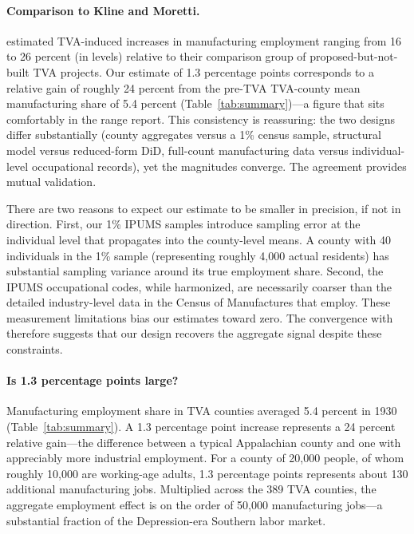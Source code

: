 \documentclass[12pt]{article}
\begin{document}
\paragraph{Comparison to Kline and Moretti.} \citet{kline2014} estimated TVA-induced increases in manufacturing employment ranging from 16 to 26 percent (in levels) relative to their comparison group of proposed-but-not-built TVA projects. Our estimate of 1.3 percentage points corresponds to a relative gain of roughly 24 percent from the pre-TVA TVA-county mean manufacturing share of 5.4 percent (Table~\ref{tab:summary})---a figure that sits comfortably in the range \citeauthor{kline2014} report. This consistency is reassuring: the two designs differ substantially (county aggregates versus a 1\% census sample, structural model versus reduced-form DiD, full-count manufacturing data versus individual-level occupational records), yet the magnitudes converge. The agreement provides mutual validation.

There are two reasons to expect our estimate to be smaller in precision, if not in direction. First, our 1\% IPUMS samples introduce sampling error at the individual level that propagates into the county-level means. A county with 40 individuals in the 1\% sample (representing roughly 4,000 actual residents) has substantial sampling variance around its true employment share. Second, the IPUMS occupational codes, while harmonized, are necessarily coarser than the detailed industry-level data in the Census of Manufactures that \citeauthor{kline2014} employ. These measurement limitations bias our estimates toward zero. The convergence with \citeauthor{kline2014} therefore suggests that our design recovers the aggregate signal despite these constraints.

\paragraph{Is 1.3 percentage points large?} Manufacturing employment share in TVA counties averaged 5.4 percent in 1930 (Table~\ref{tab:summary}). A 1.3 percentage point increase represents a 24 percent relative gain---the difference between a typical Appalachian county and one with appreciably more industrial employment. For a county of 20,000 people, of whom roughly 10,000 are working-age adults, 1.3 percentage points represents about 130 additional manufacturing jobs. Multiplied across the 389 TVA counties, the aggregate employment effect is on the order of 50,000 manufacturing jobs---a substantial fraction of the Depression-era Southern labor market.
\end{document}
